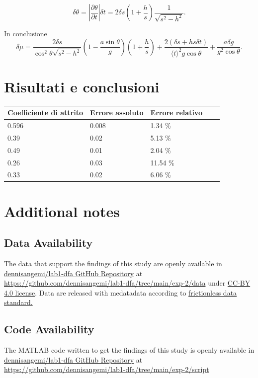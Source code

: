 \documentclass[11pt,a4paper]{article}
\begin{document}
\begin{equation}
    \delta \theta = \left | \frac{\partial \theta}{\partial t} \right | \delta t = 2 \delta s \left ( 1+\frac{h}{s} \right ) \frac{1}{\sqrt{s^2-h^2}}.
\end{equation}

In conclusione 
\begin{equation}
    \delta \mu = \frac{2\delta s}{\cos^2 \theta \sqrt{s^2-h^2}}\left ( 1- \frac{a \sin \theta}{g} \right ) \left ( 1+ \frac{h}{s}\right ) + \frac{2(\delta s + hs\delta t)}{\langle t \rangle ^2 g \cos \theta} + \frac{a \delta g}{g^2 \cos \theta}.
\end{equation}

\section{Risultati e conclusioni}

\begin{longtable}[]{@{}lllll@{}}
\toprule
Coefficiente di attrito & Errore assoluto & Errore relativo \tabularnewline
\midrule
\endhead
0.596 & 0.008 & 1.34 \% \tabularnewline
0.39 & 0.02 & 5.13 \% \tabularnewline
0.49 & 0.01 & 2.04 \% \tabularnewline
0.26 & 0.03 & 11.54 \% \tabularnewline
0.33 & 0.02 & 6.06 \% \tabularnewline
\bottomrule
\end{longtable}


\section{Additional notes}

\subsection{Data Availability}
The data that support the findings of this study are openly available in \href{https://github.com/dennisangemi/lab1-dfa/tree/main/exp-2/data}{dennisangemi/lab1-dfa GitHub Repository} at \href{https://github.com/dennisangemi/lab1-dfa/tree/main/exp-2/data}{https://github.com/dennisangemi/lab1-dfa/tree/main/exp-2/data} under \href{https://creativecommons.org/licenses/by/4.0/}{CC-BY 4.0 license}. Data are released with medatadata according to \href{https://frictionlessdata.io/standards/}{frictionless data standard.}

\subsection{Code Availability}
The MATLAB code written to get the findings of this study is openly available in \href{https://github.com/dennisangemi/lab1-dfa/tree/main/exp-2/script}{dennisangemi/lab1-dfa GitHub Repository} at \href{https://github.com/dennisangemi/lab1-dfa/tree/main/exp-2/script}{https://github.com/dennisangemi/lab1-dfa/tree/main/exp-2/script}
\end{document}
